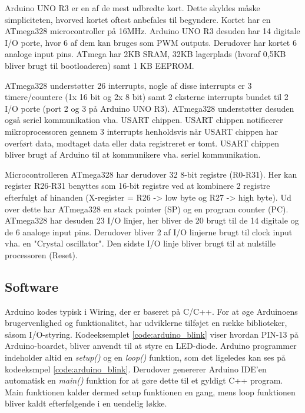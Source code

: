 Arduino UNO R3 er en af de mest udbredte kort. Dette skyldes måske simpliciteten, hvorved kortet oftest anbefales til begyndere. Kortet har en ATmega328 microcontroller på 16MHz. Arduino UNO R3 desuden har 14 digitale I/O porte, hvor 6 af dem kan bruges som PWM outputs. Derudover har kortet 6 analoge input pins. ATmega har 2KB SRAM, 32KB lagerplads (hvoraf 0,5KB bliver brugt til bootloaderen) samt 1 KB EEPROM.

ATmega328 understøtter 26 interrupts, nogle af disse interrupts er 3 timere/countere (1x 16 bit og 2x 8 bit) samt 2 eksterne interrupts bundet til 2 I/O porte (port 2 og 3 på Arduino UNO R3). ATmega328 understøtter desuden også seriel kommunikation vha. USART chippen. USART chippen notificerer mikroprocessoren gennem 3 interrupts henholdsvis når USART chippen har overført data, modtaget data eller data registreret er tomt. USART chippen bliver brugt af Arduino til at kommunikere vha. seriel kommunikation.

Microcontrolleren ATmega328 har derudover 32 8-bit registre (R0-R31). Her kan register R26-R31 benyttes som 16-bit registre ved at kombinere 2 registre efterfulgt af hinanden (X-register = R26 -> low byte og R27 -> high byte). Ud over dette har ATmega328 en stack pointer (SP) og en program counter (PC). ATmega328 har desuden 23 I/O linjer, her bliver de 20 brugt til de 14 digitale og de 6 analoge input pins. Derudover bliver 2 af I/O linjerne brugt til clock input vha. en "Crystal oscillator". Den sidste I/O linje bliver brugt til at nulstille processoren (Reset). \cite{ATmega328}\cite{ArduinoUno}


\subsection{Software}
Arduino kodes typisk i Wiring, der er baseret på C/C++. For at øge Arduinoens brugervenlighed og funktionalitet, har udviklerne tilføjet en række biblioteker, såsom I/O-styring. Kodeeksemplet \ref{code:arduino_blink} viser hvordan PIN-13 på Arduino-boardet, bliver anvendt til at styre en LED-diode. Arduino programmer indeholder altid en \textit{setup()} og en \textit{loop()} funktion, som det ligeledes kan ses på kodeeksmpel \ref{code:arduino_blink}. Derudover genererer Arduino IDE'en automatisk en \textit{main()} funktion for at gøre dette til et gyldigt C++ program. Main funktionen kalder dermed setup funktionen en gang, mens loop funktionen bliver kaldt efterfølgende i en uendelig løkke.

